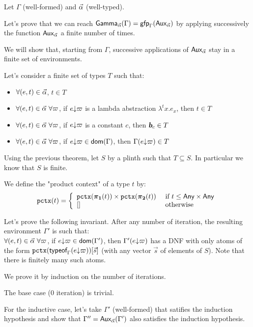 \documentclass[a4paper]{article}
\theoremstyle{definition}
\begin{document}
    Let $\Gamma$ (well-formed) and $\vec \alpha$ (well-typed).

    Let's prove that we can reach $\textsf{Gamma}_{\vec \alpha}(\Gamma)=\textsf{gfp}_\Gamma (\textsf{Aux}_{\vec \alpha})$ by applying successively the function $\textsf{Aux}_{\vec \alpha}$ a finite number of times.

    We will show that, starting from $\Gamma$, successive applications of $\textsf{Aux}_{\vec \alpha}$ stay in a finite set of environments.

    Let's consider a finite set of types $T$ such that:
    \begin{itemize}
      \item $\forall (e,t) \in \vec \alpha$, $t \in T$
      \item $\forall (e,t) \in \vec \alpha\ \forall \varpi$, if $e{\downarrow}\varpi$ is a lambda abstraction $\lambda^tx.e_x$, then $t \in T$
      \item $\forall (e,t) \in \vec \alpha\ \forall \varpi$, if $e{\downarrow}\varpi$ is a constant $c$, then $\basic{c} \in T$
      \item $\forall (e,t) \in \vec \alpha\ \forall \varpi$, if $e{\downarrow}\varpi \in \textsf{dom}(\Gamma)$, then $\Gamma(e{\downarrow}\varpi) \in T$
    \end{itemize}

    Using the previous theorem, let $S$ by a plinth such that $T \subseteq S$. In particular we know that $S$ is finite.

    We define the "product context" of a type $t$ by:
    \[
      \texttt{pctx}(t)=\left\{
        \begin{array}{ll}
          \texttt{pctx}(\boldsymbol{\pi}_{\boldsymbol 1}(t))\times \texttt{pctx}(\boldsymbol{\pi}_{\boldsymbol 2}(t)) & \text{ if } t \leq \textsf{Any}\times \textsf{Any}\\
          {[}] & \text{ otherwise}
        \end{array}  
      \right.
    \]

    Let's prove the following invariant. After any number of iteration, the resulting environment $\Gamma'$ is such that:\\
    $\forall (e,t) \in \vec \alpha\ \forall \varpi$, if $e{\downarrow}\varpi \in \textsf{dom}(\Gamma')$, then $\Gamma'(e{\downarrow}\varpi)$ has a DNF with only atoms of the form
    $\texttt{pctx}(\textsf{typeof}_{\Gamma}(e{\downarrow}\varpi))[\vec s]$ (with any vector $\vec s$ of elements of $S$).
    Note that there is finitely many such atoms.
    
    We prove it by induction on the number of iterations.

    The base case (0 iteration) is trivial.

    For the inductive case, let's take $\Gamma'$ (well-formed) that satifies the induction hypothesis
    and show that $\Gamma'' = \textsf{Aux}_{\vec \alpha}(\Gamma')$ also satisfies the induction hypothesis.
\end{document}
